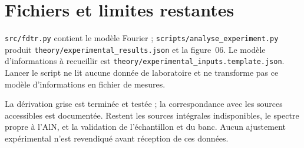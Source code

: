 \documentclass[11pt,a4paper]{article}
\begin{document}
\section{Fichiers et limites restantes}
\texttt{src/fdtr.py} contient le modèle Fourier ;
\texttt{scripts/\allowbreak analyse\_\allowbreak experiment.py} produit
\texttt{theory/\allowbreak experimental\_\allowbreak results.json} et la figure~06.
Le modèle d'informations à recueillir est
\texttt{theory/\allowbreak experimental\_\allowbreak inputs.\allowbreak template.json}.
Lancer le script ne lit aucune donnée de laboratoire et ne transforme pas
ce modèle d'informations en fichier de mesures.

La dérivation grise est terminée et testée ; la correspondance avec les sources
accessibles est documentée. Restent les sources intégrales indisponibles,
le spectre propre à l'AlN, et la validation de l'échantillon et du banc.
Aucun ajustement expérimental n'est revendiqué avant réception de ces données.
\end{document}
